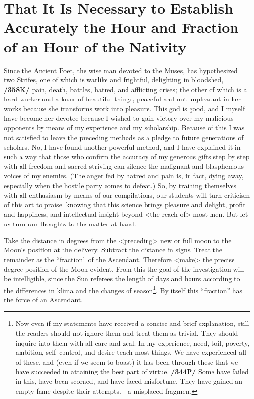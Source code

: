 \section{That It Is Necessary to Establish Accurately the Hour and Fraction of an Hour of the Nativity}

Since the Ancient Poet, the wise man devoted to the Muses, has hypothesized two Strifes, one of which is warlike and frightful, delighting in bloodshed, \textbf{/358K/} pain, death, battles, hatred, and afflicting crises; the other of which is a hard worker and a lover of beautiful things, peaceful and not unpleasant in her works because she transforms work into pleasure. This god is good, and I myself have become her devotee because I wished to gain victory over my malicious opponents by means of my experience and my scholarship. Because of this I was not satisfied to leave the preceding methods as a pledge to future generations of scholars. No, I have found another powerful method, and I have explained it in such a way that those who confirm the accuracy of my generous gifts step by step with all freedom and sacred striving can silence the malignant and blasphemous voices of my enemies. (The anger fed by hatred and pain is, in fact, dying away, especially when the hostile party comes to defeat.) So, by training themselves with all enthusiasm by means of our compilations, our students will turn criticism of this art to praise, knowing that this science brings pleasure and delight, profit and happiness, and intellectual insight beyond <the reach of> most men. But let us turn our thoughts to the matter at hand.

Take the distance in degrees from the <preceding> new or full moon to the Moon’s position at the delivery. Subtract the distance in signs. Treat the remainder as the “fraction” of the Ascendant. Therefore <make> the precise degree-position of the Moon evident. From this the goal of the investigation will be intelligible, since the Sun referees the length of days and hours according to the differences in klima and the changes of season\footnote{Now even if my statements have received a concise and brief explanation, still the readers should not ignore them and treat them as trivial. They should inquire into them with all care and zeal. In my experience, need, toil, poverty, ambition, self–control, and desire teach most things. We have experienced all of these, and (even if we seem to boast) it has been through these that we have succeeded in attaining the best part of virtue. \textbf{/344P/} Some have failed in this, have been scorned, and have faced misfortune. They have gained an empty fame despite their attempts. - a misplaced fragment}. By itself this “fraction” has the force of an Ascendant. 

